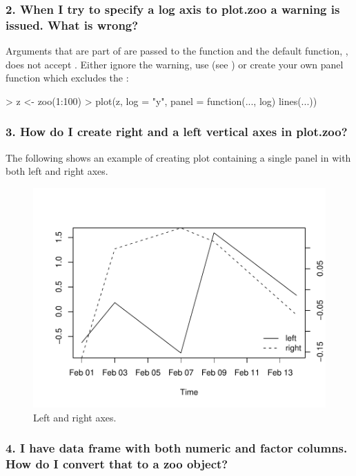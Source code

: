 \documentclass[article,nojss]{jss}
\newcommand{\mysection}[1]{\subsubsection[#1]{\textbf{#1}}}
\begin{document}
\mysection{2. When I try to specify a log axis to plot.zoo a warning is issued.  What is wrong?}

Arguments that are part of  are passed to the  
function and
the default  function, , does not accept .  
Either 
ignore the warning, use  
(see ) or create
your own panel function which excludes the :

\begin{Schunk}
\begin{Sinput}
> z <- zoo(1:100)
> plot(z, log = "y", panel = function(..., log) lines(...))
\end{Sinput}
\end{Schunk}

\mysection{3. How do I create right and a left vertical axes in plot.zoo?}

The following shows an example of creating plot containing a single
panel in with both left and right axes.  




\begin{figure}[htbp]
\begin{center}
\includegraphics{plot-axes}
\caption{\label{fig:plot-axes} Left and right  axes.}
\end{center}
\end{figure}


\mysection{4. I have data frame with both numeric and factor columns.  How do I convert that to a zoo object?}
\end{document}
